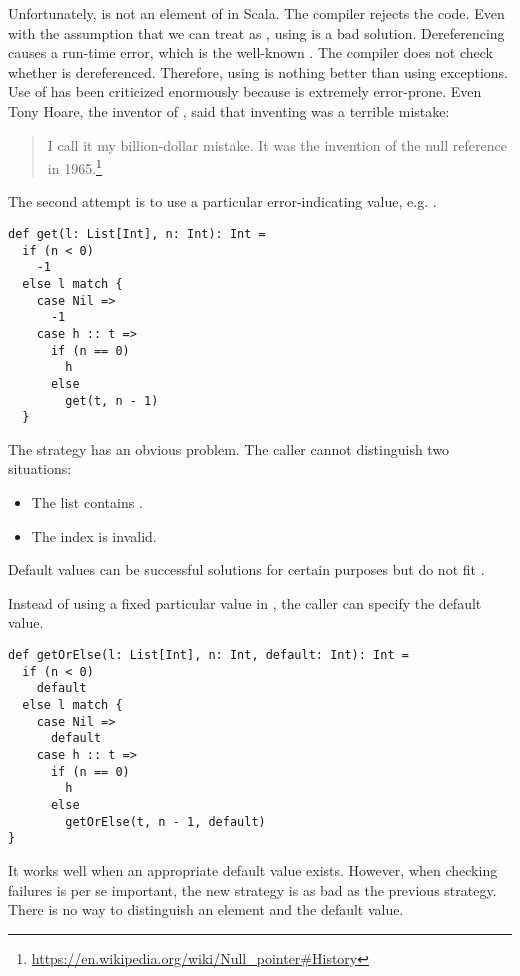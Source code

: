 Unfortunately,  is not an element of  in Scala.
The compiler rejects the code.
Even with the assumption that we can treat  as ,
using  is a bad solution. Dereferencing  causes a
run-time error, which is the well-known .
The compiler does not check whether  is dereferenced.
Therefore, using  is nothing better than using exceptions.
Use of  has been criticized enormously because  is extremely
error-prone. Even Tony Hoare, the inventor of , said that inventing
 was a terrible mistake:

\begin{quote}
I call it my billion-dollar mistake. It was the invention of the null reference
in 1965.\footnote{\url{https://en.wikipedia.org/wiki/Null\_pointer\#History}}
\end{quote}

The second attempt is to use a particular error-indicating value, e.g. .

\begin{verbatim}
def get(l: List[Int], n: Int): Int =
  if (n < 0)
    -1
  else l match {
    case Nil =>
      -1
    case h :: t =>
      if (n == 0)
        h
      else
        get(t, n - 1)
  }
\end{verbatim}

The strategy has an obvious problem. The caller cannot distinguish two
situations:
\begin{itemize}
  \item The list contains .
  \item The index is invalid.
\end{itemize}
Default values can be successful solutions for certain purposes but do not fit .

Instead of using a fixed particular value in , the caller can specify the default value.

\begin{verbatim}
def getOrElse(l: List[Int], n: Int, default: Int): Int =
  if (n < 0)
    default
  else l match {
    case Nil =>
      default
    case h :: t =>
      if (n == 0)
        h
      else
        getOrElse(t, n - 1, default)
}
\end{verbatim}

It works well when an appropriate default value
exists. However, when checking failures is per se important, the new strategy is
as bad as the previous strategy. There is no way to distinguish an element and
the default value.


